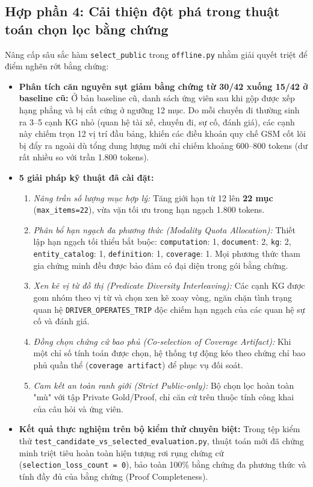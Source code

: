 \documentclass[a4paper,11pt]{article}
\begin{document}
\subsection{Hợp phần 4: Cải thiện đột phá trong thuật toán chọn lọc bằng chứng}
\label{sec:evidence-selector}

Nâng cấp sâu sắc hàm \texttt{select\_public} trong \nolinkurl{offline.py} nhằm giải quyết triệt để điểm nghẽn rớt bằng chứng:
\begin{itemize}[leftmargin=1.5em]
    \item \textbf{Phân tích căn nguyên sụt giảm bằng chứng từ 30/42 xuống 15/42 ở baseline cũ:}
    Ở bản baseline cũ, danh sách ứng viên sau khi gộp được xếp hạng phẳng và bị cắt cứng ở ngưỡng 12 mục. Do mỗi chuyến đi thường sinh ra 3--5 cạnh KG nhỏ (quan hệ tài xế, chuyến đi, sự cố, đánh giá), các cạnh này chiếm trọn 12 vị trí đầu bảng, khiến các điều khoản quy chế GSM cốt lõi bị đẩy ra ngoài dù tổng dung lượng mới chỉ chiếm khoảng 600--800 tokens (dư rất nhiều so với trần 1.800 tokens).
    \item \textbf{5 giải pháp kỹ thuật đã cài đặt:}
    \begin{enumerate}[noitemsep]
        \item \textit{Nâng trần số lượng mục hợp lý:} Tăng giới hạn từ 12 lên \textbf{22 mục} (\texttt{max\_items=22}), vừa vặn tối ưu trong hạn ngạch 1.800 tokens.
        \item \textit{Phân bổ hạn ngạch đa phương thức (Modality Quota Allocation):} Thiết lập hạn ngạch tối thiểu bắt buộc: \nolinkurl{computation}: 1, \nolinkurl{document}: 2, \nolinkurl{kg}: 2, \nolinkurl{entity_catalog}: 1, \nolinkurl{definition}: 1, \nolinkurl{coverage}: 1. Mọi phương thức tham gia chứng minh đều được bảo đảm có đại diện trong gói bằng chứng.
        \item \textit{Xen kẽ vị từ đồ thị (Predicate Diversity Interleaving):} Các cạnh KG được gom nhóm theo vị từ và chọn xen kẽ xoay vòng, ngăn chặn tình trạng quan hệ \texttt{DRIVER\_OPERATES\_TRIP} độc chiếm hạn ngạch của các quan hệ sự cố và đánh giá.
        \item \textit{Đồng chọn chứng cứ bao phủ (Co-selection of Coverage Artifact):} Khi một chỉ số tính toán được chọn, hệ thống tự động kéo theo chứng chỉ bao phủ quần thể (\texttt{coverage artifact}) để phục vụ đối soát.
        \item \textit{Cam kết an toàn ranh giới (Strict Public-only):} Bộ chọn lọc hoàn toàn "mù" với tập Private Gold/Proof, chỉ căn cứ trên thuộc tính công khai của câu hỏi và ứng viên.
    \end{enumerate}
    \item \textbf{Kết quả thực nghiệm trên bộ kiểm thử chuyên biệt:}
    Trong tệp kiểm thử \nolinkurl{test_candidate_vs_selected_evaluation.py}, thuật toán mới đã chứng minh triệt tiêu hoàn toàn hiện tượng rơi rụng chứng cứ (\texttt{selection\_loss\_count = 0}), bảo toàn 100\% bằng chứng đa phương thức và tính đầy đủ của bằng chứng (Proof Completeness).
\end{itemize}
\end{document}
